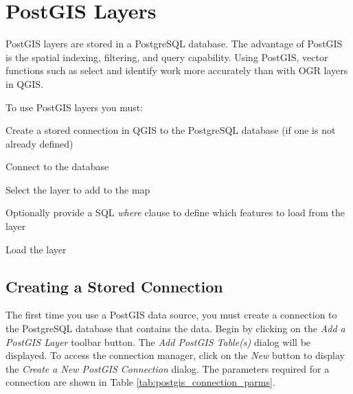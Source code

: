 \section{PostGIS Layers}
PostGIS layers are stored in a PostgreSQL database. The advantage of PostGIS
is the spatial indexing, filtering, and query capability. Using PostGIS,
vector functions such as select and identify work more accurately than with
OGR layers in QGIS.

To use PostGIS layers you must:
\begin{compactenum}
\item Create a stored connection in QGIS to the PostgreSQL database (if one is
not already defined)
\item Connect to the database
\item Select the layer to add to the map
\item Optionally provide a SQL \textit{where} clause to define which features to load from the layer
\item Load the layer
\end{compactenum}

\subsection{Creating a Stored Connection}
The first time
you use a PostGIS data source, you must create a connection to the PostgreSQL
database that contains the data. Begin by clicking on the \textit{Add a PostGIS
Layer} toolbar button. The \textsl{Add PostGIS Table(s)} dialog will be
displayed. To access the connection manager, click on the \textsl{New} button to
display the \textsl{Create a New PostGIS Connection} dialog. The parameters
required for a connection are shown in Table \ref{tab:postgis_connection_parms}.

